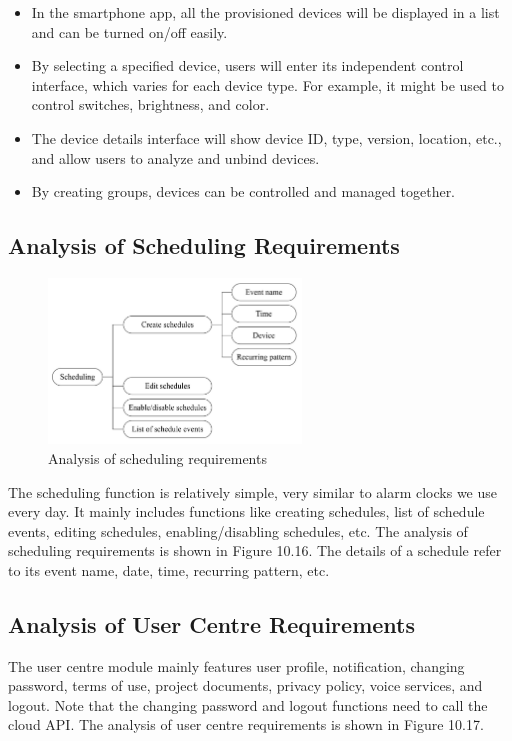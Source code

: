 \documentclass[a4paper,12pt,openany]{book}
\begin{document}
\begin{itemize}
    \item In the smartphone app, all the provisioned devices will be displayed in a list and can be turned on/off easily.
    \item By selecting a specified device, users will enter its independent control interface, which varies for each device type. For example, it might be used to control switches, brightness, and color.
    \item The device details interface will show device ID, type, version, location, etc., and allow users to analyze and unbind devices.
    \item By creating groups, devices can be controlled and managed together.
\end{itemize}

\subsection{Analysis of Scheduling Requirements}
\begin{figure}[ht]
    \centering
    \includegraphics[width=0.6\textwidth]{D10Z/10-16}
    \caption{Analysis of scheduling requirements}
\end{figure}

The scheduling function is relatively simple, very similar to alarm clocks we use every day. It mainly includes functions like creating schedules, list of schedule events, editing schedules, enabling/disabling schedules, etc. The analysis of scheduling requirements is shown in Figure 10.16. The details of a schedule refer to its event name, date, time, recurring pattern, etc.

\subsection{Analysis of User Centre Requirements}
The user centre module mainly features user profile, notification, changing password, terms of use, project documents, privacy policy, voice services, and logout. Note that the changing password and logout functions need to call the cloud API. The analysis of user centre requirements is shown in Figure 10.17.
\end{document}
